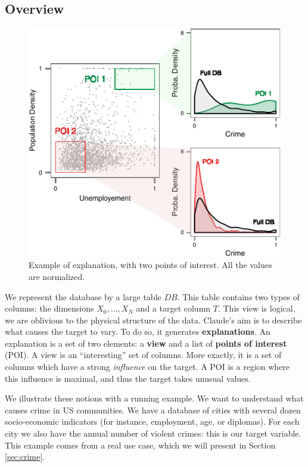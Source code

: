 \subsection{Overview}
\begin{figure}[t!]
\centering
\includegraphics[width=\columnwidth]{images/Overview}
\caption{Example of explanation, with two points of interest. All the values
are normalized.}
\label{fig:overview}
\end{figure}
We represent the database by a large table $DB$. This table contains two types
of columns: the dimensions $X_0, \ldots, X_N$ and a target column $T$. This
view is logical, we are oblivious to the physical structure of the data.
Claude's aim is to describe what causes the target to vary. To do so, it
generates \textbf{explanations}.  An explanation is a set of two elements: a
\textbf{view} and a list of \textbf{points of interest} (POI). A view is an
``interesting'' set of columns.  More exactly, it is a set of columns which
have a strong \emph{influence} on the target. A POI is a region where this
influence is maximal, and thus the target takes unusual values.

We illustrate these notions with a running example. We want to understand what
causes crime in US communities. We have a database of cities with several dozen
socio-economic indicators (for instance, employment, age, or diplomas). For
each city we also have the annual number of violent crimes: this is our target
variable. This example comes from a real use case, which we will
present in Section \ref{sec:crime}.

